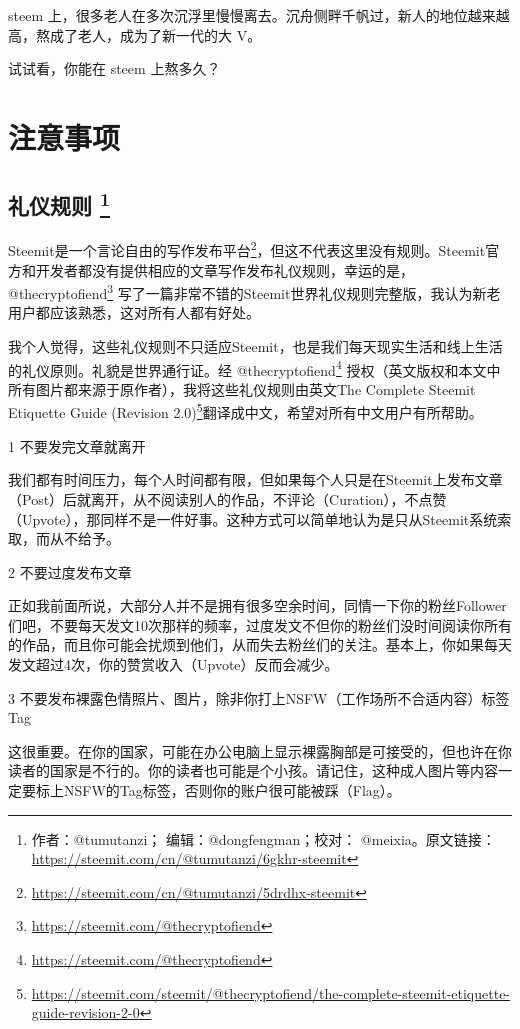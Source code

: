 \documentclass[]{ctexbook}
\renewcommand{\href}[2]{#2\footnote{\url{#1}}}
\begin{document}
steem 上，很多老人在多次沉浮里慢慢离去。沉舟侧畔千帆过，新人的地位越来越高，熬成了老人，成为了新一代的大 V。

试试看，你能在 steem 上熬多久？

\hypertarget{zysxp}{%
\chapter{注意事项}\label{zysxp}}

\section[礼仪规则 ]{\texorpdfstring{礼仪规则 \footnote{作者：@tumutanzi； 编辑：@dongfengman；校对： @meixia。原文链接：\url{https://steemit.com/cn/@tumutanzi/6gkhr-steemit}}}{礼仪规则 }}

Steemit是一个\href{https://steemit.com/cn/@tumutanzi/5drdhx-steemit}{言论自由的写作发布平台}，但这不代表这里没有规则。Steemit官方和开发者都没有提供相应的文章写作发布礼仪规则，幸运的是， \href{https://steemit.com/@thecryptofiend}{@thecryptofiend} 写了一篇非常不错的Steemit世界礼仪规则完整版，我认为新老用户都应该熟悉，这对所有人都有好处。

我个人觉得，这些礼仪规则不只适应Steemit，也是我们每天现实生活和线上生活的礼仪原则。礼貌是世界通行证。经 \href{https://steemit.com/@thecryptofiend}{@thecryptofiend} 授权（英文版权和本文中所有图片都来源于原作者），我将这些礼仪规则由\href{https://steemit.com/steemit/@thecryptofiend/the-complete-steemit-etiquette-guide-revision-2-0}{英文The Complete Steemit Etiquette Guide (Revision 2.0)}翻译成中文，希望对所有中文用户有所帮助。

1 不要发完文章就离开

我们都有时间压力，每个人时间都有限，但如果每个人只是在Steemit上发布文章（Post）后就离开，从不阅读别人的作品，不评论（Curation），不点赞（Upvote），那同样不是一件好事。这种方式可以简单地认为是只从Steemit系统索取，而从不给予。

2 不要过度发布文章

正如我前面所说，大部分人并不是拥有很多空余时间，同情一下你的粉丝Follower们吧，不要每天发文10次那样的频率，过度发文不但你的粉丝们没时间阅读你所有的作品，而且你可能会扰烦到他们，从而失去粉丝们的关注。基本上，你如果每天发文超过4次，你的赞赏收入（Upvote）反而会减少。

3 不要发布裸露色情照片、图片，除非你打上NSFW（工作场所不合适内容）标签Tag

这很重要。在你的国家，可能在办公电脑上显示裸露胸部是可接受的，但也许在你读者的国家是不行的。你的读者也可能是个小孩。请记住，这种成人图片等内容一定要标上NSFW的Tag标签，否则你的账户很可能被踩（Flag）。
\end{document}

